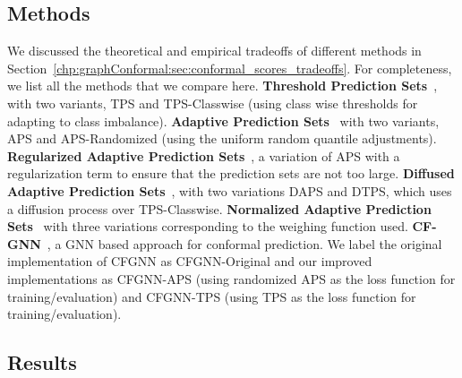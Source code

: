 \subsection{Methods}
We discussed the theoretical and empirical tradeoffs of different methods in Section~\ref{chp:graphConformal:sec:conformal_scores_tradeoffs}.
For completeness, we list all the methods that we compare here.
\textbf{Threshold Prediction Sets}~\cite{sadinle2019least}, with two variants, TPS and TPS-Classwise (using class wise thresholds for adapting to class imbalance).
\textbf{Adaptive Prediction Sets}~\cite{romano2020classification} with two variants, APS and APS-Randomized (using the uniform random quantile adjustments).
\textbf{Regularized Adaptive Prediction Sets}~\cite{angelopoulos2021uncertainty}, a variation of APS with a regularization term to ensure that the prediction sets are not too large.
\textbf{Diffused Adaptive Prediction Sets}~\cite{zargarbashi23conformal}, with two variations DAPS and DTPS, which uses a diffusion process over TPS-Classwise.
\textbf{Normalized Adaptive Prediction Sets}~\cite{clarkson2023distribution} with three variations corresponding to the weighing function used.
\textbf{CF-GNN}~\cite{huang2024uncertainty}, a GNN based approach for conformal prediction. We label the original implementation of CFGNN as CFGNN-Original and our improved implementations as CFGNN-APS (using randomized APS as the loss function for training/evaluation) and CFGNN-TPS (using TPS as the loss function for training/evaluation).


\subsection{Results}


